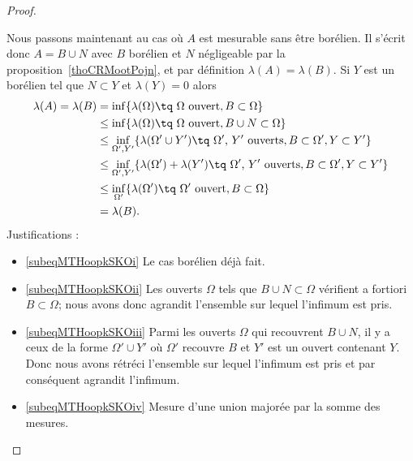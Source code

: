 \begin{proof}
\begin{subproof}
		Nous passons maintenant au cas où \( A \) est mesurable sans être borélien. Il s'écrit donc \( A=B\cup N\) avec \( B\) borélien et \( N\) négligeable par la proposition~\ref{thoCRMootPojn}, et par définition \( \lambda(A)=\lambda(B)\). Si \( Y\) est un borélien tel que \( N\subset Y\) et \( \lambda(Y)=0\) alors
		\begin{subequations}
			\begin{align}
				\lambda(A)=\lambda(B) & =\inf\{ \lambda(\Omega)\tq \text{ } \Omega\text{ ouvert}, B\subset\Omega \}\label{subeqMTHoopkSKOi}                                                           \\
				                      & \leq\inf\{ \lambda(\Omega)\tq \text{ } \Omega\text{ ouvert}, B\cup N\subset\Omega \}  \label{subeqMTHoopkSKOii}                                               \\
				                      & \leq\inf_{\Omega',Y'}\{ \lambda(\Omega'\cup Y')\tq \text{ } \Omega'\text{, } Y'\text{ ouverts}, B\subset\Omega', Y\subset Y' \}\label{subeqMTHoopkSKOiii}     \\
				                      & \leq\inf_{\Omega',Y'}\{ \lambda(\Omega')+\lambda(Y')\tq \text{ } \Omega'\text{, } Y'\text{ ouverts},  B\subset\Omega',Y\subset Y' \}\label{subeqMTHoopkSKOiv} \\
				                      & \leq\inf_{\Omega'}\{ \lambda(\Omega')\tq \text{ } \Omega'\text{ ouvert},  B\subset\Omega \}\label{subeqMTHoopkSKOv}                                           \\
				                      & =\lambda(B).
			\end{align}
		\end{subequations}
		Justifications :
		\begin{itemize}
			\item \eqref{subeqMTHoopkSKOi} Le cas borélien déjà fait.
			\item \eqref{subeqMTHoopkSKOii} Les ouverts \( \Omega\) tels que \( B\cup N\subset \Omega\) vérifient a fortiori \( B\subset \Omega\); nous avons donc agrandit l'ensemble sur lequel l'infimum est pris.
			\item \eqref{subeqMTHoopkSKOiii} Parmi les ouverts \( \Omega\) qui recouvrent \( B\cup N\), il y a ceux de la forme \( \Omega'\cup Y'\) où \( \Omega'\) recouvre \( B\) et \( Y'\) est un ouvert contenant \( Y\). Donc nous avons rétréci l'ensemble sur lequel l'infimum est pris et par conséquent agrandit l'infimum.
			\item \eqref{subeqMTHoopkSKOiv} Mesure d'une union majorée par la somme des mesures.

\end{itemize}
\end{subproof}
\end{proof}
